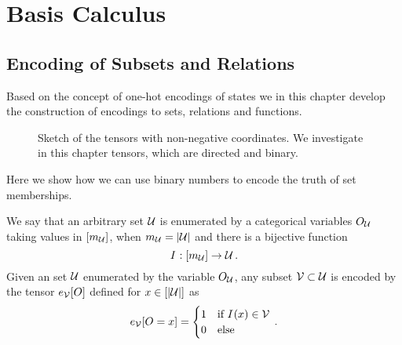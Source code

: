 \section{Basis Calculus}\label{cha:tensorEncodings}\label{cha:basisCalculus}


\subsection{Encoding of Subsets and Relations}

Based on the concept of one-hot encodings of states we in this chapter develop the construction of encodings to sets, relations and functions.

\begin{figure}[h]
	\begin{center}
		
	\end{center}
	\caption{Sketch of the tensors with non-negative coordinates. 
	We investigate in this chapter tensors, which are directed and binary.}
\end{figure}


Here we show how we can use binary numbers to encode the truth of set memberships.

\begin{definition}\label{def:subsetEncoding}
	We say that an arbitrary set $\mathcal{U}$ is enumerated by a categorical variables $O_{\mathcal{U}}$ taking values in $[m_{\mathcal{U}}]$, when $m_{\mathcal{U}}=\left|\mathcal{U}\right|$ and there is a bijective function
		\[ I^{} : [m_{\mathcal{U}}] \rightarrow \mathcal{U} \, . \]
	Given an set $\mathcal{U}$ enumerated by the variable $O_{\mathcal{U}}$, any subset $\mathcal{V}\subset\mathcal{U}$ is encoded by the tensor $e_{\mathcal{V}}[O]$ defined for $x\in[\left|\mathcal{U}\right|]$ as
	\begin{align}
	 	e_{\mathcal{V}}[O={x}] = \begin{cases}
		1 & \text{if } I^{}(x) \in \mathcal{V} \\
		0 & \text{else}
		\end{cases} \, . 
	\end{align}
\end{definition}

